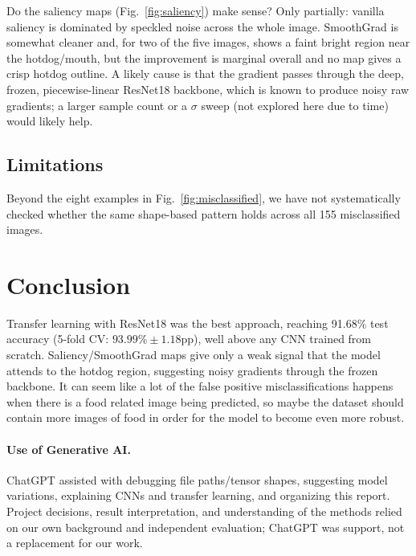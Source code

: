 \documentclass[10pt,twocolumn,letterpaper]{article}
\begin{document}
Do the saliency maps (Fig.~\ref{fig:saliency}) make sense? Only partially: vanilla saliency is dominated by speckled noise across the whole image. SmoothGrad is somewhat cleaner and, for two of the five images, shows a faint bright region near the hotdog/mouth, but the improvement is marginal overall and no map gives a crisp hotdog outline. A likely cause is that the gradient passes through the deep, frozen, piecewise-linear ResNet18 backbone, which is known to produce noisy raw gradients; a larger sample count or a $\sigma$ sweep (not explored here due to time) would likely help.

\subsection{Limitations}

Beyond the eight examples in Fig.~\ref{fig:misclassified}, we have not systematically checked whether the same shape-based pattern holds across all 155 misclassified images.

\section{Conclusion}
\label{sec:conclusion}

Transfer learning with ResNet18 was the best approach, reaching 91.68\% test accuracy (5-fold CV: $93.99\%\pm1.18$pp), well above any CNN trained from scratch. Saliency/SmoothGrad maps give only a weak signal that the model attends to the hotdog region, suggesting noisy gradients through the frozen backbone. It can seem like a lot of the false positive misclassifications happens when there is a food related image being predicted, so maybe the dataset should contain more images of food in order for the model to become even more robust.

\paragraph{Use of Generative AI.} ChatGPT assisted with debugging file paths/tensor shapes, suggesting model variations, explaining CNNs and transfer learning, and organizing this report. Project decisions, result interpretation, and understanding of the methods relied on our own background and independent evaluation; ChatGPT was support, not a replacement for our work.
\end{document}
